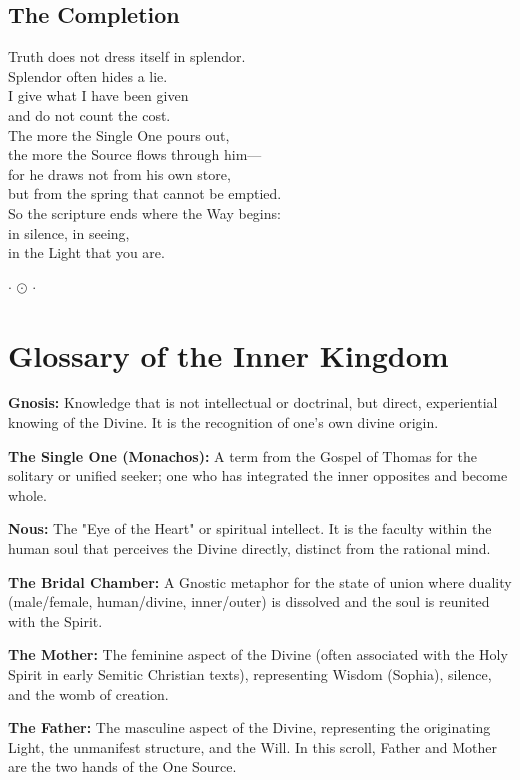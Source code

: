 \documentclass[10pt, openright]{book}
\newcommand{\ornament}{
    \vspace{1.5cm}
    \begin{center}
        \large $\cdot$ $\odot$ $\cdot$
    \end{center}
    \vspace{1.5cm}
}
\begin{document}
\section{The Completion}
Truth does not dress itself in splendor. \\
Splendor often hides a lie. \\

I give what I have been given \\
and do not count the cost. \\
The more the Single One pours out, \\
the more the Source flows through him--- \\
for he draws not from his own store, \\
but from the spring that cannot be emptied. \\

So the scripture ends where the Way begins: \\
in silence, in seeing, \\
in the Light that you are.

\ornament

\chapter{Glossary of the Inner Kingdom}
\small
\textbf{Gnosis:} Knowledge that is not intellectual or doctrinal, but direct, experiential knowing of the Divine. It is the recognition of one's own divine origin.

\textbf{The Single One (Monachos):} A term from the Gospel of Thomas for the solitary or unified seeker; one who has integrated the inner opposites and become whole.

\textbf{Nous:} The "Eye of the Heart" or spiritual intellect. It is the faculty within the human soul that perceives the Divine directly, distinct from the rational mind.

\textbf{The Bridal Chamber:} A Gnostic metaphor for the state of union where duality (male/female, human/divine, inner/outer) is dissolved and the soul is reunited with the Spirit.

\textbf{The Mother:} The feminine aspect of the Divine (often associated with the Holy Spirit in early Semitic Christian texts), representing Wisdom (Sophia), silence, and the womb of creation.

\textbf{The Father:} The masculine aspect of the Divine, representing the originating Light, the unmanifest structure, and the Will. In this scroll, Father and Mother are the two hands of the One Source.
\end{document}
